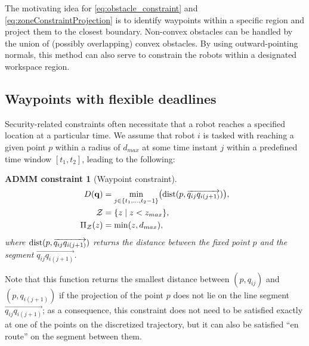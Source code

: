 \documentclass[journal]{IEEEtran}  %
\newtheorem{constraint}{ADMM constraint}
\def\sZ{\mathcal{Z}}
\begin{document}
The motivating idea for \eqref{eq:obstacle_constraint} and \eqref{eq:zoneConstraintProjection} is to identify waypoints within a specific region and project them to the closest boundary. Non-convex obstacles can be handled by the union of (possibly overlapping) convex obstacles. By using outward-pointing normals, this method can also serve to constrain the robots within a designated workspace region.

\subsection{Waypoints with flexible deadlines}\label{sec:waypoint-constraint}
Security-related constraints often necessitate that a robot reaches a specified location at a particular time. We assume that robot $i$ is tasked with reaching a given point $p$ within a radius of $d_{max}$ at some time instant $j$ within a predefined time window $[t_1,t_2]$, leading to the following:

\begin{constraint}[Waypoint constraint]
\begin{align}
     	D(\vq) &= \min_{j\in\{t_1,\dots,t_2-1\}}\bigl(\dist(p,\overrightarrow{q_{ij}q_{i(j+1)}})\bigr),\\
\label{eq:waypoint_constraint}
  \sZ &= \{z \mid z < z_{max} \},\\
   \Pi_\sZ(z) & = \min(z, d_{max}),
\end{align}
where $\operatorname{dist}(p,\overrightarrow{q_{ij}q_{i(j+1)}})$ returns the distance between the fixed point $p$ and the segment $\overrightarrow{q_{ij}q_{i(j+1)}}$.
\end{constraint}

 Note that this function returns the smallest distance between $(p,q_{ij})$ and $(p,q_{i(j+1)})$ if the projection of the point $p$ does not lie on the line segment~$\overrightarrow{q_{ij}q_{i(j+1)}}$; as a consequence, this constraint does not need to be satisfied exactly at one of the points on the discretized trajectory, but it can also be satisfied ``en route'' on the segment between them.

\end{document}

